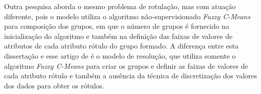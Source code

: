 % 

Outra pesquisa \cite{Filho2015}  aborda o mesmo problema de rotulação, mas com atuação diferente, pois o modelo utiliza o algoritmo não-supervisionado \textit{Fuzzy C-Means} para composição dos grupos, em que o número de grupos é fornecido na inicialização do algoritmo e também na definição das faixas de valores de atributos de cada atributo rótulo do grupo formado. A diferença entre esta dissertação e esse artigo de  é o modelo de resolução, que utiliza somente o algoritmo \textit{Fuzzy C-Means} para criar os grupos e definir as faixas de valores de cada atributo rótulo e também a ausência da técnica de discretização dos valores dos dados para obter os rótulos.




